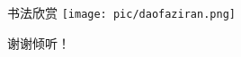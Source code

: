 \documentclass{beamer}
\begin{document}
\begin{frame}{书法欣赏} %
    \centering
    \texttt{[image: pic/daofaziran.png]}
\end{frame}

\begin{frame}
    \begin{center}
        {\Large\calligra 谢谢倾听！}
    \end{center}
\end{frame}
\end{document}
